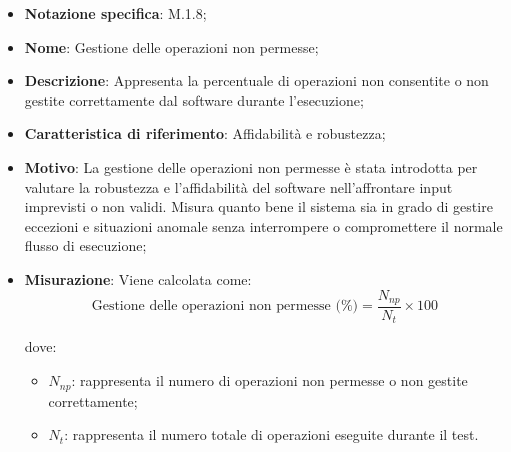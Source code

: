 \begin{itemize}
    \item \textbf{Notazione specifica}: M.1.8;
    \item \textbf{Nome}:  Gestione delle operazioni non permesse;
    \item \textbf{Descrizione}: Appresenta la percentuale di operazioni non consentite o non gestite correttamente dal software durante l'esecuzione;
    \item \textbf{Caratteristica di riferimento}: Affidabilità e robustezza;
    \item \textbf{Motivo}: La gestione delle operazioni non permesse è stata introdotta per valutare la robustezza e l'affidabilità del software nell'affrontare input imprevisti o non validi. Misura quanto bene il sistema sia in grado di gestire eccezioni e situazioni anomale senza interrompere o compromettere il normale flusso di esecuzione;
    \item \textbf{Misurazione}: Viene calcolata come:
    \[
    \text{Gestione delle operazioni non permesse (\%)} = \frac{N_{np}}{N_{t}} \times 100
    \]
    
    dove:
    \begin{itemize}
        \item $N_{np}$: rappresenta il numero di operazioni non permesse o non gestite correttamente;
        \item $N_{t}$: rappresenta il numero totale di operazioni eseguite durante il test.
    \end{itemize}
\end{itemize}
